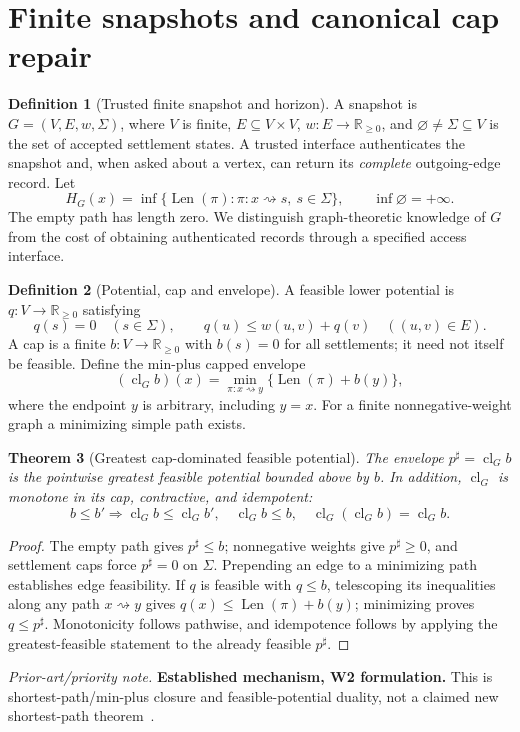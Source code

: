 \documentclass[11pt,letterpaper]{article}
\newtheorem{theorem}{Theorem}[section]
\theoremstyle{definition}
\newtheorem{definition}[theorem]{Definition}
\theoremstyle{remark}
\newcommand{\Cl}{\operatorname{cl}}
\newcommand{\Len}{\operatorname{Len}}
\newcommand{\Rnn}{\mathbb{R}_{\geq0}}
\newcommand{\sett}{\Sigma}
\newcommand{\novel}[1]{\par\begingroup\small\textit{Prior-art/priority note.} #1\par\endgroup}
\begin{document}
\section{Finite snapshots and canonical cap repair}
\begin{definition}[Trusted finite snapshot and horizon]
A snapshot is \(G=(V,E,w,\sett)\), where \(V\) is finite, \(E\subseteq V\times V\), \(w:E\to\Rnn\), and \(\varnothing\ne\sett\subseteq V\) is the set of accepted settlement states. A trusted interface authenticates the snapshot and, when asked about a vertex, can return its \emph{complete} outgoing-edge record. Let
\[
H_G(x)=\inf\{\Len(\pi):\pi:x\rightsquigarrow s,\ s\in\sett\},\qquad\inf\varnothing=+\infty.
\]
The empty path has length zero. We distinguish graph-theoretic knowledge of \(G\) from the cost of obtaining authenticated records through a specified access interface.
\end{definition}
\begin{definition}[Potential, cap and envelope]
A feasible lower potential is \(q:V\to\Rnn\) satisfying
\[
q(s)=0\quad(s\in\sett),\qquad q(u)\le w(u,v)+q(v)\quad((u,v)\in E).
\]
A cap is a finite \(b:V\to\Rnn\) with \(b(s)=0\) for all settlements; it need not itself be feasible. Define the min-plus capped envelope
\begin{equation}\label{eq:closure}
(\Cl_Gb)(x)=\min_{\pi:x\rightsquigarrow y}\{\Len(\pi)+b(y)\},
\end{equation}
where the endpoint \(y\) is arbitrary, including \(y=x\). For a finite nonnegative-weight graph a minimizing simple path exists.
\end{definition}

\begin{theorem}[Greatest cap-dominated feasible potential]\label{thm:greatest}
The envelope \(p^\sharp=\Cl_Gb\) is the pointwise greatest feasible potential bounded above by \(b\). In addition, \(\Cl_G\) is monotone in its cap, contractive, and idempotent:
\[
b\le b'\Rightarrow\Cl_Gb\le\Cl_Gb',\quad \Cl_Gb\le b,\quad\Cl_G(\Cl_Gb)=\Cl_Gb.
\]
\end{theorem}
\begin{proof}
The empty path gives \(p^\sharp\le b\); nonnegative weights give \(p^\sharp\ge0\), and settlement caps force \(p^\sharp=0\) on \(\sett\). Prepending an edge to a minimizing path establishes edge feasibility. If \(q\) is feasible with \(q\le b\), telescoping its inequalities along any path \(x\rightsquigarrow y\) gives \(q(x)\le \Len(\pi)+b(y)\); minimizing proves \(q\le p^\sharp\). Monotonicity follows pathwise, and idempotence follows by applying the greatest-feasible statement to the already feasible \(p^\sharp\).
\end{proof}
\novel{\textbf{Established mechanism, W2 formulation.} This is shortest-path/min-plus closure and feasible-potential duality, not a claimed new shortest-path theorem~\cite{Bellman,Dijkstra,Mohri,Goldberg}.}
\end{document}
